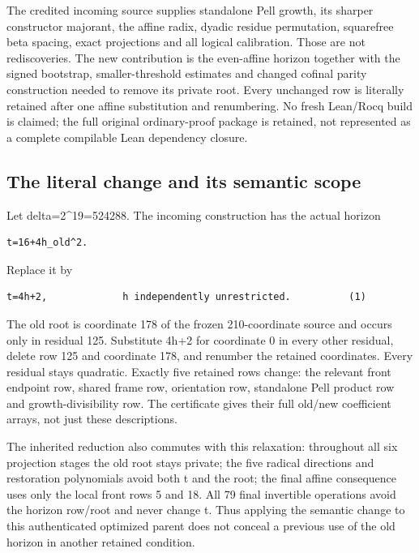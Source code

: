 The credited incoming source supplies standalone Pell growth, its
sharper constructor majorant, the affine radix, dyadic residue
permutation, squarefree beta spacing, exact projections and all logical
calibration. Those are not rediscoveries. The new contribution is the
even-affine horizon together with the signed bootstrap,
smaller-threshold estimates and changed cofinal parity construction
needed to remove its private root. Every unchanged row is literally
retained after one affine substitution and renumbering. No fresh
Lean/Rocq build is claimed; the full original ordinary-proof package is
retained, not represented as a complete compilable Lean dependency
closure.

\subsection{The literal change and its semantic
scope}\label{the-literal-change-and-its-semantic-scope}

Let delta=2\^{}19=524288. The incoming construction has the actual
horizon

\begin{verbatim}
t=16+4h_old^2.
\end{verbatim}

Replace it by

\begin{verbatim}
t=4h+2,             h independently unrestricted.          (1)
\end{verbatim}

The old root is coordinate 178 of the frozen 210-coordinate source and
occurs only in residual 125. Substitute 4h+2 for coordinate 0 in every
other residual, delete row 125 and coordinate 178, and renumber the
retained coordinates. Every residual stays quadratic. Exactly five
retained rows change: the relevant front endpoint row, shared frame row,
orientation row, standalone Pell product row and growth-divisibility
row. The certificate gives their full old/new coefficient arrays, not
just these descriptions.

The inherited reduction also commutes with this relaxation: throughout
all six projection stages the old root stays private; the five radical
directions and restoration polynomials avoid both t and the root; the
final affine consequence uses only the local front rows 5 and 18. All 79
final invertible operations avoid the horizon row/root and never change
t. Thus applying the semantic change to this authenticated optimized
parent does not conceal a previous use of the old horizon in another
retained condition.


